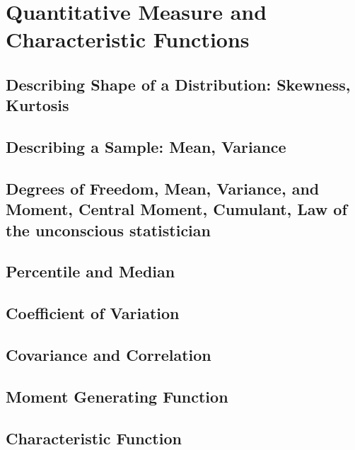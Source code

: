 \chapter{Quantitative Measure and Characteristic Functions}
\section{Describing Shape of a Distribution: Skewness, Kurtosis}
\section{Describing a Sample: Mean, Variance}
\section{Degrees of Freedom, Mean, Variance, and Moment, Central Moment, Cumulant, Law of the unconscious statistician}
\section{Percentile and Median}
\section{Coefficient of Variation}
\section{Covariance and Correlation}
\section{Moment Generating Function}
\section{Characteristic Function}
